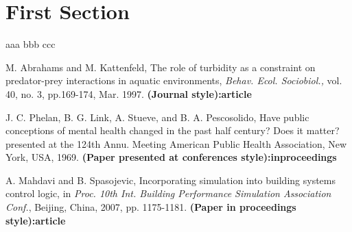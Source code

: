 \documentclass{article}
\begin{document}
\section{First Section}
\nocite{*}
aaa \cite{abrahams1997role} bbb\cite{phelan1996have} ccc\cite{mahdavi2007incorporating}




\begin{thebibliography}{99}
\normalsize\addtolength{\itemsep}{-1em}
\vspace {1.5mm}

M. Abrahams and M. Kattenfeld, The role of turbidity as a constraint on predator-prey interactions in aquatic environments, \emph{Behav. Ecol. Sociobiol.,} vol. 40, no. 3, pp.169-174, Mar. 1997. \textbf{(Journal style):article}

J. C. Phelan, B. G. Link, A. Stueve, and B. A. Pescosolido, Have public conceptions of mental health changed in the past half century? Does it matter? presented at the 124th Annu. Meeting American Public Health Association, New York, USA, 1969. \textbf{(Paper presented at conferences style):inproceedings}

A. Mahdavi and B. Spasojevic, Incorporating simulation into building systems control logic, in \emph{Proc. 10th Int. Building Performance Simulation Association Conf.}, Beijing, China, 2007, pp. 1175-1181. \textbf{(Paper in proceedings style):article}


\end{thebibliography}
\end{document}
